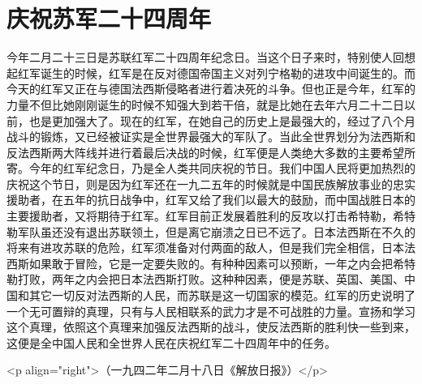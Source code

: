 \section[庆祝苏军二十四周年（一九四二年）]{庆祝苏军二十四周年}


今年二月二十三日是苏联红军二十四周年纪念日。当这个日子来时，特别使人回想起红军诞生的时候，红军是在反对德国帝国主义对列宁格勒的进攻中间诞生的。而今天的红军又正在与德国法西斯侵略者进行着决死的斗争。但也正是今年，红军的力量不但比她刚刚诞生的时候不知强大到若干倍，就是比她在去年六月二十二日以前，也是更加强大了。现在的红军，在她自己的历史上是最强大的，经过了八个月战斗的锻炼，又已经被证实是全世界最强大的军队了。当此全世界划分为法西斯和反法西斯两大阵线并进行着最后决战的时候，红军便是人类绝大多数的主要希望所寄。今年的红军纪念日，乃是全人类共同庆祝的节日。我们中国人民将更加热烈的庆祝这个节日，则是因为红军还在一九二五年的时候就是中国民族解放事业的忠实援助者，在五年的抗日战争中，红军又给了我们以最大的鼓励，而中国战胜日本的主要援助者，又将期待于红军。红军目前正发展着胜利的反攻以打击希特勒，希特勒军队虽还没有退出苏联领土，但是离它崩溃之日已不远了。日本法西斯在不久的将来有进攻苏联的危险，红军须准备对付两面的敌人，但是我们完全相信，日本法西斯如果敢于冒险，它是一定要失败的。有种种因素可以预断，一年之内会把希特勒打败，两年之内会把日本法西斯打败。这种种因素，便是苏联、英国、美国、中国和其它一切反对法西斯的人民，而苏联是这一切国家的模范。红军的历史说明了一个无可置辩的真理，只有与人民相联系的武力才是不可战胜的力量。宣扬和学习这个真理，依照这个真理来加强反法西斯的战斗，使反法西斯的胜利快一些到来，这便是全中国人民和全世界人民在庆祝红军二十四周年中的任务。

<p align="right">（一九四二年二月十八日《解放日报》）</p>

